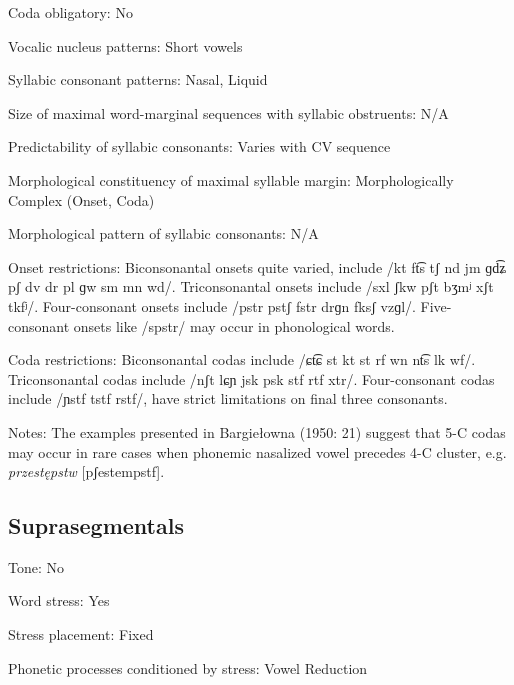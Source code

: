 {\begin{appendixdesc}
\item[Coda obligatory:] No

\item[Vocalic nucleus patterns:] Short vowels

\item[Syllabic consonant patterns:] Nasal, Liquid

\item[Size of maximal word-marginal sequences with syllabic obstruents:] N/A

\item[Predictability of syllabic consonants:] Varies with CV sequence

\item[Morphological constituency of maximal syllable margin:] Morphologically Complex (Onset, Coda)

\item[Morphological pattern of syllabic consonants:] N/A

\item[Onset restrictions:] Biconsonantal onsets quite varied, include /kt ft͡s tʃ nd jm ɡd͡ʑ pʃ dv dr pl ɡw sm mn wd/. Triconsonantal onsets include /sxl ʃkw pʃt bʒmʲ xʃt tkfʲ/. Four-consonant onsets include /pstr pstʃ fstr drɡn fksʃ vzɡl/. Five-consonant onsets like /spstr/ may occur in phonological words.

\item[Coda restrictions:] Biconsonantal codas include /ɕt͡ɕ st kt st rf wn nt͡s lk wf/. Triconsonantal codas include /nʃt lɕɲ jsk psk stf rtf xtr/. Four-consonant codas include /ɲstf tstf rstf/, have strict limitations on final three consonants.

\item[Notes:] The examples presented in Bargiełowna (1950: 21) suggest that 5-C codas may occur in rare cases when phonemic nasalized vowel precedes 4-C cluster, e.g. \textit{przestępstw} [pʃestempstf].
\end{appendixdesc}
\subsection*{Suprasegmentals}
\begin{appendixdesc}
\item[Tone:] No

\item[Word stress:] Yes

\item[Stress placement:] Fixed

\item[Phonetic processes conditioned by stress:] Vowel Reduction


\end{appendixdesc}}
